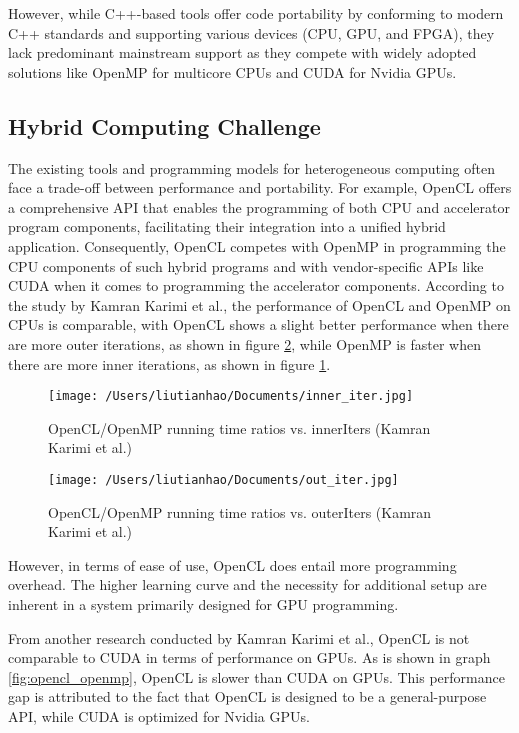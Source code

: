 \documentclass[13pt]{article}
\begin{document}
However, while C++-based tools offer code portability by conforming to modern C++ standards and supporting various devices (CPU, GPU, and FPGA), they lack predominant mainstream support as they compete with widely adopted solutions like OpenMP\cite{openmp} for multicore CPUs and CUDA for Nvidia GPUs.


\subsection{Hybrid Computing Challenge}
The existing tools and programming models for heterogeneous computing often face a trade-off between performance and portability.
For example, OpenCL offers a comprehensive API that enables the programming of both CPU and accelerator program components, facilitating their integration into a unified hybrid application. Consequently, OpenCL competes with OpenMP in programming the CPU components of such hybrid programs and with vendor-specific APIs like CUDA when it comes to programming the accelerator components.
According to the study by Kamran Karimi et al.\cite{opencl_openmp}, the performance of OpenCL and OpenMP on CPUs is comparable, with OpenCL shows a slight better performance when there are more outer iterations, as shown in figure \ref{fig:out_iter}, while OpenMP is faster when there are more inner iterations, as shown in figure \ref{fig:inner_iter}.
\begin{figure}[h!]
    \centering
    \texttt{[image: /Users/liutianhao/Documents/inner\_iter.jpg]}
    \caption{OpenCL/OpenMP running time ratios vs. innerIters (Kamran Karimi et al.\cite{opencl_openmp})}
    \label{fig:inner_iter}
\end{figure}

\begin{figure}[h!]
    \centering
    \texttt{[image: /Users/liutianhao/Documents/out\_iter.jpg]}
    \caption{OpenCL/OpenMP running time ratios vs. outerIters (Kamran Karimi et al.\cite{opencl_openmp})}
    \label{fig:out_iter}
\end{figure}

However, in terms of ease of use, OpenCL does entail more programming overhead. The higher learning curve and the necessity for additional setup are inherent in a system primarily designed for GPU programming. 



From another research conducted by Kamran Karimi et al.\cite{cuda_opencl}, OpenCL is not comparable to CUDA in terms of performance on GPUs. As is shown in graph \ref{fig:opencl_openmp}, OpenCL is slower than CUDA on GPUs. 
This performance gap is attributed to the fact that OpenCL is designed to be a general-purpose API, while CUDA is optimized for Nvidia GPUs.
\end{document}
